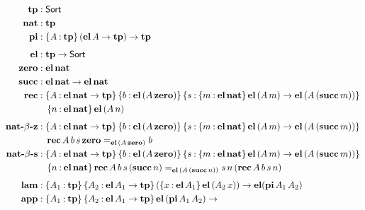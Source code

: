 \documentclass[11pt,twoside]{article}
\newcommand{\braces}[1]{\{#1\}}
\newcommand{\parens}[1]{(#1)}
\newcommand{\sortclass}{\ensuremath{\textsf{Sort}}}
\newcommand{\eqclass}[3]{{#2}=_{#1}{#3}}
\newcommand{\piclass}[3]{\braces{{#2}\mathbin{:}{#1}}\,{#3}}
\newcommand{\arrclass}[2]{{#1}\to{#2}}
\newcommand{\appobj}[2]{{#1}\,{#2}}
\begin{document}
\begin{figure}
  
  \begin{align*}
    \tpsort
    & : \sortclass \\
    \nattp
    & : \tpsort \\
    \pitp
    & : \piclass{\tpsort}{A}{\arrclass{\parens{\arrclass{\elof{A}}{\tpsort}}}{\tpsort}} \\[1ex]
%
    \elfam 
    & : \arrclass{\tpsort}{\sortclass} \\
    \zerocon
    & : \elof{\nattp} \\
    \succcon
    & : \arrclass {\elof{\nattp}}{\elof{\nattp}} \\
    \reccon
    &  :
      \piclass{\arrclass{\elof{\nattp}}{\tpsort}}{A}{
      \piclass{\elofp{\appobj{A}{\zerocon}}}{b}{
      \piclass{\piclass{\elof{\nattp}}{m}{\arrclass{\elofp{\appobj{A}{m}}}{\elofp{\appobj{A}{\parens{\succof{m}}}}}}}{s}{
      }}} \\
    & \quad
      \piclass{\elof{\nattp}}{n}{\elofp{\appobj{A}{n}}} \\[1ex] 
%
    \natbetaz
    & :
      \piclass{\arrclass{\elof{\nattp}}{\tpsort}}{A}{
      \piclass{\elofp{\appobj{A}{\zerocon}}}{b}{
      \piclass{\piclass{\elof{\nattp}}{m}{\arrclass{\elofp{\appobj{A}{m}}}{\elofp{\appobj{A}{\parens{\succof{m}}}}}}}{s}{
      }}} \\
    & \quad
      \eqclass{\elofp{\appobj{A}{\zerocon}}}{\recof{A}{b}{s}{\zerocon}}{b} \\
%
    \natbetas
    & :
      \piclass{\arrclass{\elof{\nattp}}{\tpsort}}{A}{
      \piclass{\elofp{\appobj{A}{\zerocon}}}{b}{
      \piclass{\piclass{\elof{\nattp}}{m}{\arrclass{\elofp{\appobj{A}{m}}}{\elofp{\appobj{A}{\parens{\succof{m}}}}}}}{s}{
      }}} \\
    & \quad
      \piclass{\elof{\nattp}}{n}{
      \eqclass{\elofp{\appobj{A}{\parens{\succof{n}}}}}
      {\recof{A}{b}{s}{\parens{\succof{n}}}}
      {\appobj{\appobj{s}{n}}{\parens{\recof{A}{b}{s}{n}}}}} \\[1ex]
%
    \lamcon
    & :
      \piclass{\tpsort}{A_{1}}{
      \piclass{\arrclass{\elof{A_{1}}}{\tpsort}}{A_{2}}{
      \arrclass{\parens{\piclass{\elof{A_{1}}}{x}{\elofp{\appobj{A_{2}}{x}}}}}{
      \elfam{\parens{\piof{A_{1}}{A_{2}}}}}}} \\
    \appcon
    & :
      \piclass{\tpsort}{A_{1}}{
      \piclass{\arrclass{\elof{A_{1}}}{\tpsort}}{A_{2}}{
      \arrclass{\elofp{\piof{A_{1}}{A_{2}}}}{
}}}
\end{align*}
\end{figure}
\end{document}
